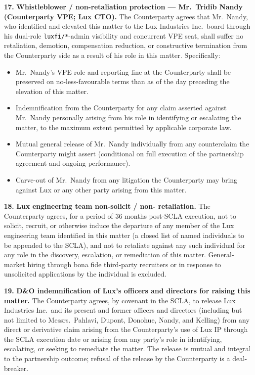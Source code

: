 \documentclass[11pt,letterpaper]{article}
\begin{document}
\textbf{17.} \textbf{Whistleblower / non-retaliation protection ---
Mr.\ Tridib Nandy (Counterparty VPE; Lux CTO).} The Counterparty
agrees that Mr.\ Nandy, who identified and elevated this matter to
the Lux Industries Inc.\ board through his dual-role
\texttt{luxfi/*}-admin visibility and concurrent VPE seat, shall
suffer no retaliation, demotion, compensation reduction, or
constructive termination from the Counterparty side as a result of
his role in this matter. Specifically:
\begin{itemize}[leftmargin=2em,itemsep=0.1em]
\item Mr.\ Nandy's VPE role and reporting line at the Counterparty
shall be preserved on no-less-favourable terms than as of the day
preceding the elevation of this matter.
\item Indemnification from the Counterparty for any claim asserted
against Mr.\ Nandy personally arising from his role in identifying
or escalating the matter, to the maximum extent permitted by
applicable corporate law.
\item Mutual general release of Mr.\ Nandy individually from any
counterclaim the Counterparty might assert (conditional on full
execution of the partnership agreement and ongoing performance).
\item Carve-out of Mr.\ Nandy from any litigation the Counterparty
may bring against Lux or any other party arising from this matter.
\end{itemize}

\textbf{18.} \textbf{Lux engineering team non-solicit / non-
retaliation.} The Counterparty agrees, for a period of 36 months
post-SCLA execution, not to solicit, recruit, or otherwise induce
the departure of any member of the Lux engineering team identified
in this matter (a closed list of named individuals to be appended to
the SCLA), and not to retaliate against any such individual for any
role in the discovery, escalation, or remediation of this matter.
General-market hiring through bona fide third-party recruiters or
in response to unsolicited applications by the individual is
excluded.

\textbf{19.} \textbf{D\&O indemnification of Lux's officers and
directors for raising this matter.} The Counterparty agrees, by
covenant in the SCLA, to release Lux Industries Inc.\ and its
present and former officers and directors (including but not
limited to Messrs.\ Pahlavi, Dupont, Donohue, Nandy, and Kelling)
from any direct or derivative claim arising from the Counterparty's
use of Lux IP through the SCLA execution date or arising from any
party's role in identifying, escalating, or seeking to remediate
the matter. The release is mutual and integral to the partnership
outcome; refusal of the release by the Counterparty is a deal-
breaker.
\end{document}
